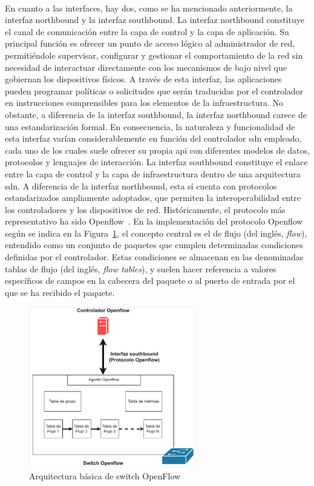 \\
En cuanto a las interfaces, hay dos, como se ha mencionado anteriormente, la interfaz northbound y la interfaz southbound. La interfaz northbound constituye el canal de comunicación entre la capa de control y la capa de aplicación. Su principal función es ofrecer un punto de acceso lógico al administrador de red, permitiéndole supervisar, configurar y gestionar el comportamiento de la red sin necesidad de interactuar directamente con los mecanismos de bajo nivel que gobiernan los dispositivos físicos. A través de esta interfaz, las aplicaciones pueden programar políticas o solicitudes que serán traducidas por el controlador en instrucciones comprensibles para los elementos de la infraestructura. No obstante, a diferencia de la interfaz southbound, la interfaz northbound carece de una estandarización formal. En consecuencia, la naturaleza y funcionalidad de esta interfaz varían considerablemente en función del controlador \gls{sdn} empleado, cada uno de los cuales suele ofrecer su propia \gls{api} con diferentes modelos de datos, protocolos y lenguajes de interacción. La interfaz southbound constituye el enlace entre la capa de control y la capa de infraestructura dentro de una arquitectura \gls{sdn}. A diferencia de la interfaz northbound, esta sí cuenta con protocolos estandarizados ampliamente adoptados, que permiten la interoperabilidad entre los controladores y los dispositivos de red. Históricamente, el protocolo más representativo ha sido Openflow~\cite{mckeown2008openflow}. En la implementación del protocolo Openflow según se indica en la Figura~\ref{fig:sdn_openflow}, el concepto central es el de flujo (del inglés, \textit{flow}), entendido como un conjunto de paquetes que cumplen determinadas condiciones definidas por el controlador. Estas condiciones se almacenan en las denominadas tablas de flujo (del inglés, \textit{flow tables}), y suelen hacer referencia a valores específicos de campos en la cabecera del paquete o al puerto de entrada por el que se ha recibido el paquete.

\begin{figure}[ht!]
\centering
\includegraphics[width=0.65\textwidth]{fig/02_sota/sota_3_sdn_openflow.drawio.pdf}
\caption{Arquitectura básica de switch OpenFlow}
\label{fig:sdn_openflow}
\end{figure}

